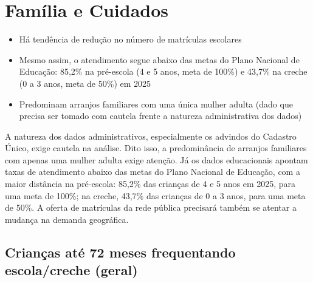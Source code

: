 
\chapter{Família e Cuidados}\label{cap:eixo-3}

\begin{achados}\begin{itemize}

\item Há tendência de redução no número de matrículas escolares

\item Mesmo assim, o atendimento segue abaixo das metas do Plano Nacional de Educação: 85,2\% na pré-escola (4 e 5 anos, meta de 100\%) e 43,7\% na creche (0 a 3 anos, meta de 50\%) em 2025

\item Predominam arranjos familiares com uma única mulher adulta (dado que precisa ser tomado com cautela frente a natureza administrativa dos dados)

\end{itemize}\end{achados}

A natureza dos dados administrativos, especialmente os advindos do Cadastro Único, exige cautela na análise. Dito isso, a predominância de arranjos familiares com apenas uma mulher adulta exige atenção. Já os dados educacionais apontam taxas de atendimento abaixo das metas do Plano Nacional de Educação, com a maior distância na pré-escola: 85,2\% das crianças de 4 e 5 anos em 2025, para uma meta de 100\%; na creche, 43,7\% das crianças de 0 a 3 anos, para uma meta de 50\%. A oferta de matrículas da rede pública precisará também se atentar a mudança na demanda geográfica.

\section{Crianças até 72 meses frequentando escola/\allowbreak{}creche (geral)}

